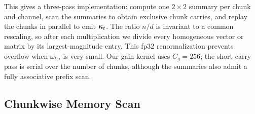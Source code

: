\documentclass[11pt,letterpaper,logo]{yalearxiv}
\begin{document}
This gives a three-pass implementation: compute one $2\times2$ summary per chunk and channel,
scan the summaries to obtain exclusive chunk carries, and replay the chunks in parallel to emit
$\boldsymbol{\kappa}_t$. The ratio $n/d$ is invariant to a common rescaling, so after each multiplication
we divide every homogeneous vector or matrix by its largest-magnitude entry. This fp32
renormalization prevents overflow when $\omega_{t,i}$ is very small. Our gain kernel uses
$C_g=256$; the short carry pass is serial over the number of chunks, although the summaries also
admit a fully associative prefix scan.

\subsection{Chunkwise Memory Scan}
\label{sec:chunkwise-memory}
\end{document}

